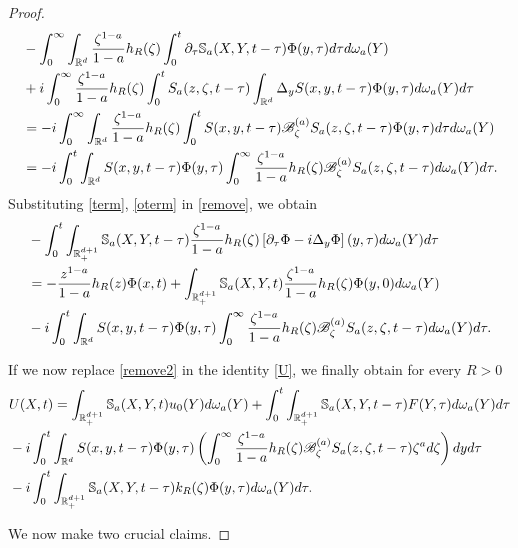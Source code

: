 \documentclass[11pt,letter]{amsart}
\def \RN {\mathbb{R}_+^{d+1}}
\newcommand{\Rd}{\mathbb R^d}
\newcommand{\p}{\partial}
\numberwithin{equation}{section}
\numberwithin{equation}{section}
\begin{document}
\begin{proof}
\begin{align}\label{oterm}
& - \int_0^\infty \int_{\Rd} \frac{\zeta^{1-a}}{1-a} h_R(\zeta) \int_0^{t} \p_\tau \mathbb S_a(X,Y,t-\tau)  \Phi(y,\tau) d\tau d\omega_a(Y)
\\
& + i  \int_0^\infty \frac{\zeta^{1-a}}{1-a} h_R(\zeta) \int_0^t S_a(z,\zeta,t-\tau) \int_{\Rd} \Delta_y S(x,y,t-\tau) \Phi(y,\tau) d\omega_a(Y)d\tau
\notag
\\
& = - i \int_0^\infty \int_{\Rd} \frac{\zeta^{1-a}}{1-a} h_R(\zeta) \int_0^{t} S(x,y,t-\tau) \mathscr B_\zeta^{(a)} S_{a}(z,\zeta,t-\tau)  \Phi(y,\tau) d\tau d\omega_a(Y)
\notag
\\
& = - i \int_0^{t} \int_{\Rd}    S(x,y,t-\tau) \Phi(y,\tau)\int_0^\infty \frac{\zeta^{1-a}}{1-a} h_R(\zeta) \mathscr B_\zeta^{(a)} S_{a}(z,\zeta,t-\tau)   d\omega_a(Y) d\tau.
\notag
\end{align}
Substituting \eqref{term}, \eqref{oterm} in \eqref{remove}, we obtain
\begin{align}\label{remove2}
& - \int_0^t \int_{\RN} \mathbb S_a(X,Y,t-\tau) \frac{\zeta^{1-a}}{1-a} h_R(\zeta)\left[\p_\tau \Phi - i  \Delta_y \Phi\right](y,\tau) d\omega_a(Y) d\tau
\\
& = - \frac{z^{1-a}}{1-a} h_R(z)\Phi(x,t)  + \int_{\RN}  \mathbb S_a(X,Y,t) \frac{\zeta^{1-a}}{1-a} h_R(\zeta) \Phi(y,0) d\omega_a(Y)
\notag
\\
&  - i \int_0^{t} \int_{\Rd}    S(x,y,t-\tau) \Phi(y,\tau)\int_0^\infty \frac{\zeta^{1-a}}{1-a} h_R(\zeta) \mathscr B_\zeta^{(a)} S_{a}(z,\zeta,t-\tau)   d\omega_a(Y) d\tau.
\notag
\end{align}

If we now replace \eqref{remove2} in the identity \eqref{U}, 
we finally obtain for every $R>0$
\begin{align}\label{nicea}
& U(X,t) = \int_{\RN} \mathbb S_a(X,Y,t) u_0(Y)d\omega_a(Y) +  \int_0^t \int_{\RN} \mathbb S_a(X,Y,t-\tau) F(Y,\tau) d\omega_a(Y) d\tau
\\
& - i \int_0^{t} \int_{\Rd}    S(x,y,t-\tau) \Phi(y,\tau)\left(\int_0^\infty \frac{\zeta^{1-a}}{1-a}  h_R(\zeta) \mathscr B_\zeta^{(a)} S_{a}(z,\zeta,t-\tau) \zeta^a d\zeta\right)  dy d\tau
\notag
\\
&   - i \int_0^t \int_{\RN} \mathbb S_a(X,Y,t-\tau) k_R(\zeta) \Phi(y,\tau) d\omega_a(Y) d\tau.
\notag
\end{align}

We now make two crucial claims.

\medskip


\end{proof}
\end{document}
